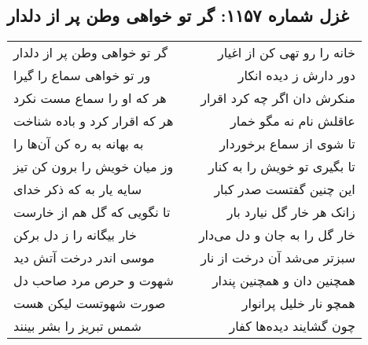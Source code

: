 \begin{center}
\section*{غزل شماره ۱۱۵۷: گر تو خواهی وطن پر از دلدار}
\label{sec:1157}
\begin{longtable}{l p{0.5cm} r}
گر تو خواهی وطن پر از دلدار
&&
خانه را رو تهی کن از اغیار
\\
ور تو خواهی سماع را گیرا
&&
دور دارش ز دیده انکار
\\
هر که او را سماع مست نکرد
&&
منکرش دان اگر چه کرد اقرار
\\
هر که اقرار کرد و باده شناخت
&&
عاقلش نام نه مگو خمار
\\
به بهانه به ره کن آن‌ها را
&&
تا شوی از سماع برخوردار
\\
وز میان خویش را برون کن تیز
&&
تا بگیری تو خویش را به کنار
\\
سایه یار به که ذکر خدای
&&
این چنین گفتست صدر کبار
\\
تا نگویی که گل هم از خارست
&&
زانک هر خار گل نیارد بار
\\
خار بیگانه را ز دل برکن
&&
خار گل را به جان و دل می‌دار
\\
موسی اندر درخت آتش دید
&&
سبزتر می‌شد آن درخت از نار
\\
شهوت و حرص مرد صاحب دل
&&
همچنین دان و همچنین پندار
\\
صورت شهوتست لیکن هست
&&
همچو نار خلیل پرانوار
\\
شمس تبریز را بشر بینند
&&
چون گشایند دیده‌ها کفار
\\
\end{longtable}
\end{center}

